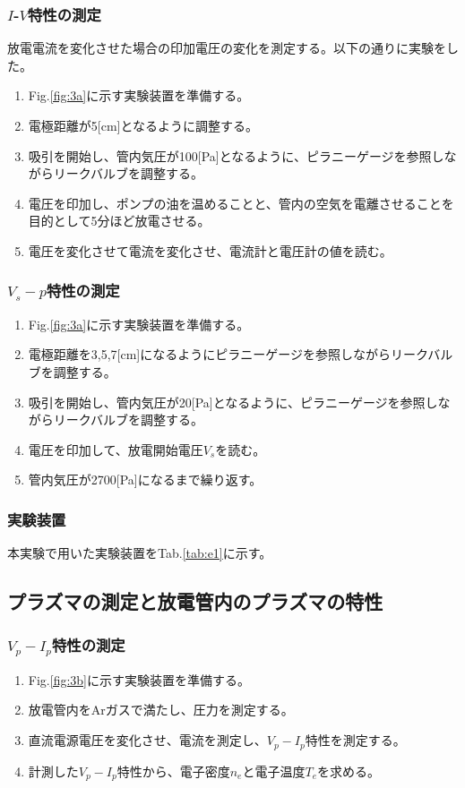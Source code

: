 \documentclass[dvipdfmx]{jsarticle}
\newcommand{\figlab}[1]{Fig.\ref{fig:#1}}%
\newcommand{\tablab}[1]{Tab.\ref{tab:#1}}%
\begin{document}
        \subsubsection*{$I$-$V$特性の測定}
            放電電流を変化させた場合の印加電圧の変化を測定する。以下の通りに実験をした。
            \begin{enumerate}[label=\textbf{(\arabic*)}]
            \item \figlab{3a}に示す実験装置を準備する。
            \item 電極距離が5[cm]となるように調整する。
            \item 吸引を開始し、管内気圧が100[Pa]となるように、ピラニーゲージを参照しながらリークバルブを調整する。
            \item 電圧を印加し、ポンプの油を温めることと、管内の空気を電離させることを目的として5分ほど放電させる。
            \item 電圧を変化させて電流を変化させ、電流計と電圧計の値を読む。
            \end{enumerate}
        \subsubsection*{$V_s - p$特性の測定}
            \begin{enumerate}[label=\textbf{(\arabic*)}]
            \item \figlab{3a}に示す実験装置を準備する。
            \item 電極距離を3,5,7[cm]になるようにピラニーゲージを参照しながらリークバルブを調整する。
            \item 吸引を開始し、管内気圧が20[Pa]となるように、ピラニーゲージを参照しながらリークバルブを調整する。
            \item 電圧を印加して、放電開始電圧$V_s$を読む。
            \item 管内気圧が2700[Pa]になるまで繰り返す。
            \end{enumerate}      
        \subsubsection*{実験装置}
            本実験で用いた実験装置を\tablab{e1}に示す。

        
    \subsection{プラズマの測定と放電管内のプラズマの特性}
        \subsubsection*{$V_p - I_p$特性の測定}
            \begin{enumerate}[label=\textbf{(\arabic*)}]
            \item \figlab{3b}に示す実験装置を準備する。
            \item 放電管内をArガスで満たし、圧力を測定する。
            \item 直流電源電圧を変化させ、電流を測定し、$V_p - I_p$特性を測定する。
            \item 計測した$V_p - I_p$特性から、電子密度$n_e$と電子温度$T_e$を求める。
            \end{enumerate}
\end{document}

